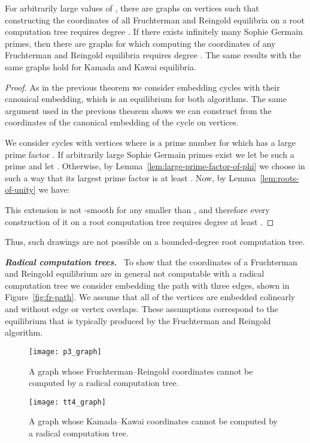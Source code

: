 \documentclass[oribibl,10pt]{llncs}
\newcommand{\Emph}[1]{\smallskip\textbf{\textit{#1}}~}
\begin{document}
\begin{theorem}\label{thm:force-root}
For arbitrarily large values of , there are graphs on  vertices such that constructing the coordinates of all Fruchterman and Reingold equilibria on a root computation tree requires degree . If there exists infinitely many Sophie Germain primes, then there are graphs for which computing the coordinates of any Fruchterman and Reingold equilibria requires degree . The same results with the same graphs hold for Kamada and Kawai equilibria.
\end{theorem}
\begin{proof}
As in the previous theorem we consider embedding cycles with their canonical embedding, which is an equilibrium for both algorithms. The same argument used in the previous theorem shows we can construct  from the coordinates of the canonical embedding of the cycle on  vertices.

We consider cycles with  vertices where  is a prime number for which  has a large prime factor . If arbitrarily large Sophie Germain primes exist we let  be such a prime and let . Otherwise, by Lemma~\ref{lem:large-prime-factor-of-phi} we choose  in such a way that its largest prime factor  is at least . Now, by Lemma~\ref{lem:roots-of-unity} we have:

This extension is not -smooth for any  smaller than , and therefore every construction of it on a root computation tree requires degree at least .
\end{proof}

Thus, such drawings are not possible on a bounded-degree root computation tree.

\Emph{Radical computation trees.}
To show that the coordinates of a Fruchterman and Reingold equilibrium are in general not computable with a radical computation tree we consider embedding the path with three edges, shown in Figure~\ref{fig:fr-path}. 
We assume that all of the vertices are embedded colinearly and without edge or vertex overlaps. These assumptions correspond to the equilibrium that is typically produced by the Fruchterman and Reingold algorithm.


\begin{figure}[tb]
\begin{minipage}[t]{0.4\textwidth} 
\centering
\texttt{[image: p3\_graph]}
\caption{A graph whose Fruchterman--Reingold coordinates cannot be computed by a radical computation tree.}
\label{fig:fr-path}
\end{minipage}\hfill
\begin{minipage}[t]{0.4\textwidth} 
\centering
\texttt{[image: tt4\_graph]}
\caption{A graph whose Kamada--Kawai coordinates cannot be computed by a radical computation tree.}
\label{fig:kk-radical}
\end{minipage}
\end{figure}
\end{document}
